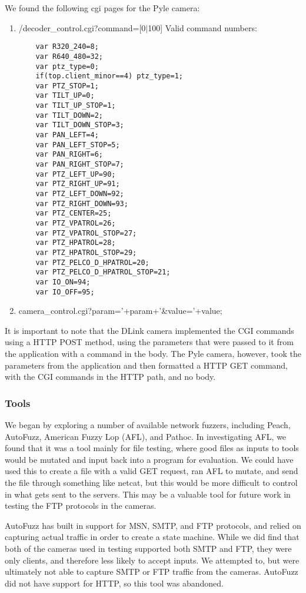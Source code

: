 \documentclass[letterpaper,twocolumn,10pt]{article}
\begin{document}
We found the following cgi pages for the Pyle camera:
\begin{enumerate}
	\item /decoder\_control.cgi?command=[0$\mid$100]
	\newline Valid command numbers:
	\begin{verbatim}
	var R320_240=8;
	var R640_480=32;
	var ptz_type=0;	
	if(top.client_minor==4) ptz_type=1;
	var PTZ_STOP=1;
	var TILT_UP=0;
	var TILT_UP_STOP=1;
	var TILT_DOWN=2;
	var TILT_DOWN_STOP=3;
	var PAN_LEFT=4;
	var PAN_LEFT_STOP=5;
	var PAN_RIGHT=6;
	var PAN_RIGHT_STOP=7;
	var PTZ_LEFT_UP=90;
	var PTZ_RIGHT_UP=91;
	var PTZ_LEFT_DOWN=92;
	var PTZ_RIGHT_DOWN=93;
	var PTZ_CENTER=25;
	var PTZ_VPATROL=26;
	var PTZ_VPATROL_STOP=27;
	var PTZ_HPATROL=28;
	var PTZ_HPATROL_STOP=29;
	var PTZ_PELCO_D_HPATROL=20;
	var PTZ_PELCO_D_HPATROL_STOP=21;
	var IO_ON=94;
	var IO_OFF=95;
	\end{verbatim}
	\item camera\_control.cgi?param='+param+'\&value='+value; 
\end{enumerate}

It is important to note that the DLink camera implemented the CGI commands using a HTTP POST method, using the parameters that were passed to it from the application with a command in the body. The Pyle camera, however, took the parameters from the application and then formatted a HTTP GET command, with the CGI commands in the HTTP path, and no body.


\subsubsection{Tools}
We began by exploring a number of available network fuzzers, including Peach, AutoFuzz, American Fuzzy Lop (AFL), and Pathoc. In investigating AFL, we found that it was a tool mainly for file testing, where good files as inputs to tools would be mutated and input back into a program for evaluation. We could have used this to create a file with a valid GET request, ran AFL to mutate, and send the file through something like netcat, but this would be more difficult to control in what gets sent to the servers. This may be a valuable tool for future work in testing the FTP protocols in the cameras.

AutoFuzz has built in support for MSN, SMTP, and FTP protocols, and relied on capturing actual traffic in order to create a state machine. While we did find that both of the cameras used in testing supported both SMTP and FTP, they were only clients, and therefore less likely to accept inputs. We attempted to, but were ultimately not able to capture SMTP or FTP traffic from the cameras. AutoFuzz did not have support for HTTP, so this tool was abandoned.
\end{document}
